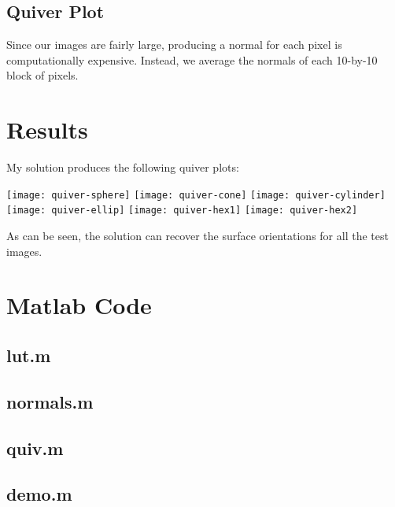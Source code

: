 \documentclass{article}
\begin{document}
\subsection{Quiver Plot}
Since our images are fairly large, producing a normal for each pixel
is computationally expensive. Instead, we average the normals of each
10-by-10 block of pixels.

\section{Results}

My solution produces the following quiver plots:

\begin{center}
  \texttt{[image: quiver-sphere]}
  \texttt{[image: quiver-cone]}
  \texttt{[image: quiver-cylinder]}
  \texttt{[image: quiver-ellip]}
  \texttt{[image: quiver-hex1]}
  \texttt{[image: quiver-hex2]}
\end{center}

As can be seen, the solution can recover the surface orientations for
all the test images.

\section{Matlab Code}

\subsection{lut.m}



\subsection{normals.m}



\subsection{quiv.m}



\subsection{demo.m}


\end{document}
